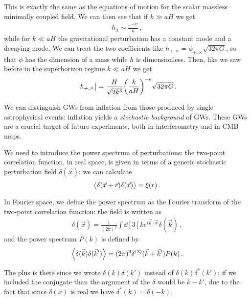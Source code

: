 \documentclass[main.tex]{subfiles}
\begin{document}
This is exactly the same as the equations of motion for the scalar massless minimally coupled field. 
We can then see that if \(k \gg aH\) we get 
%
\begin{align}
h_\lambda \sim \frac{e^{-ik \tau }}{a}
\,,
\end{align}
%
while for \(k \ll aH\) the gravitational perturbation has a constant mode and a decaying mode. 
We can treat the two coefficients like \(h_{+, \times } = \phi_{+, \times } \sqrt{32 \pi G}\), 
so that \(\phi \) has the dimension of a mass while \(h\) is dimensionless. 
Then, like we saw before in the superhorizon regime \(k\ll aH\) we get
%
\begin{align}
\abs{h_{+, \times }} = \frac{H}{\sqrt{2 k^3}}
\qty( \frac{k}{aH})^{-\epsilon } \sqrt{32 \pi G}
\,.
\end{align}

We can distinguish GWs from inflation from those produced by single astrophysical events: inflation yields a \emph{stochastic background} of GWs. 
These GWs are a crucial target of future experiments, both in interferometry and in CMB maps. 

We need to introduce the power spectrum of perturbations: 
the two-point correlation function, in real space, is given in terms of a generic stochastic perturbation field \(\delta (\vec{x})\): we can calculate 
%
\begin{align}
\expval{ \delta (\vec{x} + \vec{r}) \delta (\vec{x})} = \xi (r)
\,.
\end{align}

In Fourier space, we define the power spectrum as the Fourier transform of the two-point correlation function: the field is written as 
%
\begin{align}
\delta (\vec{x}) = \frac{1}{(2\pi )^3} \int \dd[3]{k} e^{i \vec{k} \cdot \vec{x}} \delta (\vec{k})
\,,
\end{align}
%
and the power spectrum \(P(k)\) is defined by
%
\begin{align}
\expval{ \delta (\vec{k}) \delta (\vec{k}')} = (2\pi )^3 \delta^{(3)} (\vec{k} + \vec{k}') P(k)
\,.
\end{align}

The plus is there since we wrote \(\delta (k) \delta (k')\) instead of \(\delta(k) \delta^{*}(k')\): if we included the conjugate than the argument of the \(\delta \) would be \(k - k'\), due to the fact that since \(\delta (x)\) is real we have \(\delta^{*}(k) = \delta (-k)\). 
\end{document}
